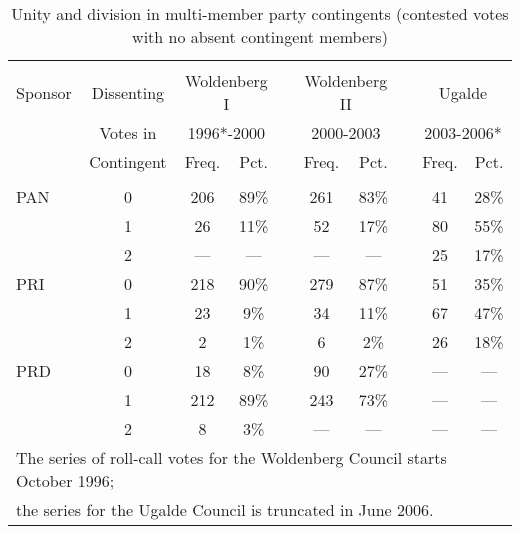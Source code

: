\documentclass[12 pt, letter]{article}
\begin{document}
\begin{table}
\caption{Unity and division in multi-member party contingents (contested votes with no absent contingent members)}\label{T:unidiv}
\begin{center}
\begin{tabular}{lccccccccc}
\hline\\ [-1.5ex]
Sponsor & Dissenting & \multicolumn{2}{c}{ Woldenberg I} & & \multicolumn{2}{c}{ Woldenberg II} && \multicolumn{2}{c}{Ugalde} \\
 & Votes in & \multicolumn{2}{c}{1996*-2000} & & \multicolumn{2}{c}{2000-2003} && \multicolumn{2}{c}{2003-2006*} \\ \cline{3-4} \cline{6-7} \cline{9-10}
 & Contingent & Freq. & Pct. && Freq. & Pct. && Freq. & Pct.  \\
\hline \\ [-1ex]
PAN & 0 & 206 & 89\% & &261 & 83\% && 41 & 28\% \\
 &    1 &  26 & 11\% & & 52 & 17\% && 80 & 55\% \\
 &    2 & --- & ---  & &--- & ---  && 25 & 17\% \\ [1.3ex]
PRI & 0 & 218 & 90\% & &279 & 87\% && 51 & 35\% \\
 &    1 &  23 &  9\% & & 34 & 11\% && 67 & 47\% \\
 &    2 &   2 &  1\% & &  6 &  2\% && 26 & 18\% \\ [1.3ex]
PRD & 0 &  18 &  8\% & & 90 & 27\% && --- & --- \\
 &    1 & 212 & 89\% & &243 & 73\% && --- & --- \\
 &    2 &   8 &  3\% & &--- & ---  && --- & --- \\
\hline \multicolumn{10}{l}{\small *The series of roll-call votes for the Woldenberg Council starts October 1996;}\\
\multicolumn{10}{l}{\small the series for the Ugalde Council is truncated in June 2006.}
\end{tabular}
\end{center}
\end{table}
\end{document}
